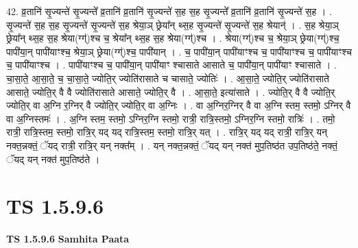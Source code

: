 \documentclass[17pt]{extarticle}
\begin{document}
42. व्र॒तानि॑ सृ॒ज्यन्ते॑ सृ॒ज्यन्ते᳚ व्र॒तानि॑ व्र॒तानि॑ सृ॒ज्यन्ते॑ स॒ह स॒ह सृ॒ज्यन्ते᳚ व्र॒तानि॑ व्र॒तानि॑ सृ॒ज्यन्ते॑ स॒ह । . सृ॒ज्यन्ते॑ स॒ह स॒ह सृ॒ज्यन्ते॑ सृ॒ज्यन्ते॑ स॒ह श्रेया॒ञ् छ्रेया᳚न् थ्स॒ह सृ॒ज्यन्ते॑ सृ॒ज्यन्ते॑ स॒ह श्रेयान्॑ । . स॒ह श्रेया॒ञ् छ्रेया᳚न् थ्स॒ह स॒ह श्रेया(ग्ग्॑)श्च च॒ श्रेया᳚न् थ्स॒ह स॒ह श्रेया(ग्ग्॑)श्च । . श्रेया(ग्ग्॑)श्च च॒ श्रेया॒ञ् छ्रेया(ग्ग्॑)श्च॒ पापी॑या॒न् पापी॑याꣳश्च॒ श्रेया॒ञ् छ्रेया(ग्ग्॑)श्च॒ पापी॑यान् । . च॒ पापी॑या॒न् पापी॑याꣳश्च च॒ पापी॑याꣳश्च च॒ पापी॑याꣳश्च च॒ पापी॑याꣳश्च । . पापी॑याꣳश्च च॒ पापी॑या॒न् पापी॑याꣳ श्चासाते आसाते च॒ पापी॑या॒न् पापी॑याꣳ श्चासाते । . चा॒सा॒ते॒ आ॒सा॒ते॒ च॒ चा॒सा॒ते॒ ज्योति॒र् ज्योति॑रासाते च चासाते॒ ज्योतिः॑ । . आ॒सा॒ते॒ ज्योति॒र् ज्योति॑रासाते आसाते॒ ज्योति॒र् वै वै ज्योति॑रासाते आसाते॒ ज्योति॒र् वै । . आ॒सा॒ते॒ इत्या॑साते । . ज्योति॒र् वै वै ज्योति॒र् ज्योति॒र् वा अ॒ग्नि र॒ग्निर् वै ज्योति॒र् ज्योति॒र् वा अ॒ग्निः । . वा अ॒ग्निर॒ग्निर् वै वा अ॒ग्नि स्तम॒ स्तमो॒ ऽग्निर् वै वा अ॒ग्निस्तमः॑ । . अ॒ग्नि स्तम॒ स्तमो॒ ऽग्निर॒ग्नि स्तमो॒ रात्री॒ रात्रि॒स्तमो॒ ऽग्निर॒ग्नि स्तमो॒ रात्रिः॑ । . तमो॒ रात्री॒ रात्रि॒स्तम॒ स्तमो॒ रात्रि॒र् यद् यद् रात्रि॒स्तम॒ स्तमो॒ रात्रि॒र् यत् । . रात्रि॒र् यद् यद् रात्री॒ रात्रि॒र् यन् नक्त॒न्नक्तं॒ ॅयद् रात्री॒ रात्रि॒र् यन् नक्त᳚म् । . यन् नक्त॒न्नक्तं॒ ॅयद् यन् नक्त॑ मुप॒तिष्ठ॑त उप॒तिष्ठ॑ते॒ नक्तं॒ ॅयद् यन् नक्त॑ मुप॒तिष्ठ॑ते । \newline
\pagebreak
{}

\section{ TS 1.5.9.6 }

\textbf{TS 1.5.9.6 } \newline
\textbf{Samhita Paata} \newline
\end{document}
